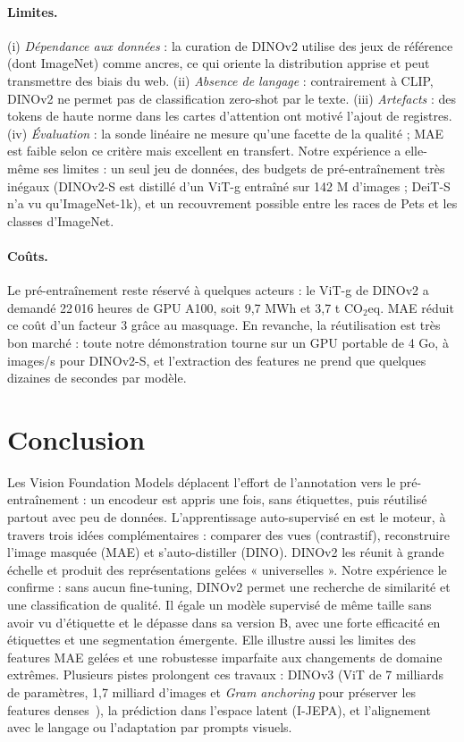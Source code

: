 \documentclass[11pt,a4paper]{article}
\begin{document}
\paragraph{Limites.} (i) \emph{Dépendance aux données} : la curation de DINOv2 utilise des jeux de référence (dont ImageNet) comme ancres, ce qui oriente la distribution apprise et peut transmettre des biais du web. (ii) \emph{Absence de langage} : contrairement à CLIP, DINOv2 ne permet pas de classification zero-shot par le texte. (iii) \emph{Artefacts} : des tokens de haute norme dans les cartes d'attention ont motivé l'ajout de registres. (iv) \emph{Évaluation} : la sonde linéaire ne mesure qu'une facette de la qualité ; MAE est faible selon ce critère mais excellent en transfert. Notre expérience a elle-même ses limites : un seul jeu de données, des budgets de pré-entraînement très inégaux (DINOv2-S est distillé d'un ViT-g entraîné sur 142 M d'images ; DeiT-S n'a vu qu'ImageNet-1k), et un recouvrement possible entre les races de Pets et les classes d'ImageNet.

\paragraph{Coûts.} Le pré-entraînement reste réservé à quelques acteurs : le ViT-g de DINOv2 a demandé 22\,016 heures de GPU A100, soit 9,7 MWh et 3,7 t CO$_2$eq. MAE réduit ce coût d'un facteur 3 grâce au masquage. En revanche, la réutilisation est très bon marché : toute notre démonstration tourne sur un GPU portable de 4 Go, à \RIpsDinoS{} images/s pour DINOv2-S, et l'extraction des features ne prend que quelques dizaines de secondes par modèle.

\section{Conclusion}
Les Vision Foundation Models déplacent l'effort de l'annotation vers le pré-entraînement : un encodeur est appris une fois, sans étiquettes, puis réutilisé partout avec peu de données. L'apprentissage auto-supervisé en est le moteur, à travers trois idées complémentaires : comparer des vues (contrastif), reconstruire l'image masquée (MAE) et s'auto-distiller (DINO). DINOv2 les réunit à grande échelle et produit des représentations gelées « universelles ». Notre expérience le confirme : sans aucun fine-tuning, DINOv2 permet une recherche de similarité et une classification de qualité. Il égale un modèle supervisé de même taille sans avoir vu d'étiquette et le dépasse dans sa version B, avec une forte efficacité en étiquettes et une segmentation émergente. Elle illustre aussi les limites des features MAE gelées et une robustesse imparfaite aux changements de domaine extrêmes. Plusieurs pistes prolongent ces travaux : DINOv3 (ViT de 7 milliards de paramètres, 1,7 milliard d'images et \emph{Gram anchoring} pour préserver les features denses~\citep{simeoni2025dinov3}), la prédiction dans l'espace latent (I-JEPA), et l'alignement avec le langage ou l'adaptation par prompts visuels.

\clearpage   %
\footnotesize
\setlength{\bibsep}{2pt}


\end{document}
